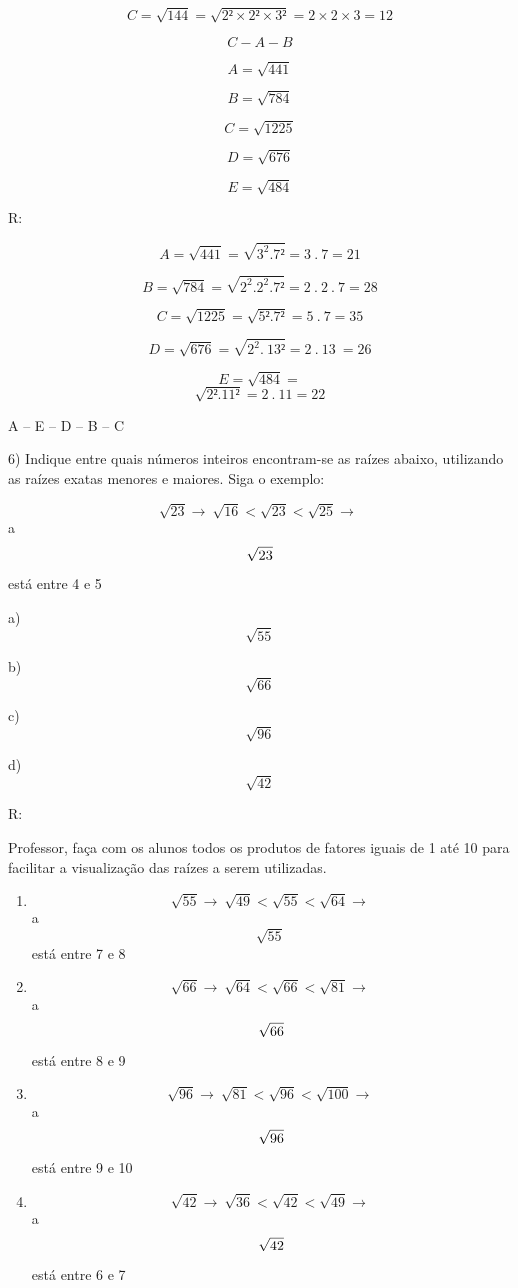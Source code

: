 \[C = \sqrt{144} = \sqrt{2² \times 2² \times 3²} = 2 \times 2 \times 3 = 12\]

\[C - A - B\]

\[A = \sqrt{441}\]

\[B = \sqrt{784}\]

\[C = \sqrt{1225}\]

\[D = \sqrt{676}\]

\[E = \sqrt{484}\]

R:

\[A = \sqrt{441} = \sqrt{3^{2}.7²} = 3\ .\ 7 = 21\]

\[B = \sqrt{784} = \sqrt{2^{2}.2^{2}.7²} = 2\ .\ 2\ .\ 7 = 28\]

\[C = \sqrt{1225} = \sqrt{5².7²} = 5\ .\ 7 = 35\]

\[D = \sqrt{676} = \sqrt{2^{2}.\ 13²} = 2\ .\ 13\  = 26\]

\[E = \sqrt{484} =\] \[\sqrt{2².11²} = 2\ .\ 11 = 22\]

A -- E -- D -- B -- C

6) Indique entre quais números inteiros encontram-se as raízes abaixo,
utilizando as raízes exatas menores e maiores. Siga o exemplo:

\[\sqrt{23} \rightarrow \ \sqrt{16} < \sqrt{23} < \sqrt{25} \rightarrow \ \]a
\[\sqrt{23}\\\] está entre 4 e 5

a) \[\sqrt{55}\]

b) \[\sqrt{66}\]

c) \[\sqrt{96}\]

d) \[\sqrt{42}\]

R:

Professor, faça com os alunos todos os produtos de fatores iguais de 1
até 10 para facilitar a visualização das raízes a serem utilizadas.

\begin{enumerate}
\def\labelenumi{\alph{enumi})}
\item
  \[\sqrt{55} \rightarrow \ \sqrt{49} < \sqrt{55} < \sqrt{64} \rightarrow \ \]a
  \[\sqrt{55}\ \] está entre 7 e 8
\item
  \[\sqrt{66} \rightarrow \ \sqrt{64} < \sqrt{66} < \sqrt{81} \rightarrow \ \]a
  \[\sqrt{66}\\\] está entre 8 e 9
\item
  \[\sqrt{96} \rightarrow \ \sqrt{81} < \sqrt{96} < \sqrt{100} \rightarrow \ \]a
  \[\sqrt{96}\\\] está entre 9 e 10
\item
  \[\sqrt{42} \rightarrow \ \sqrt{36} < \sqrt{42} < \sqrt{49} \rightarrow \ \]a
  \[\sqrt{42}\\\] está entre 6 e 7
\end{enumerate}

